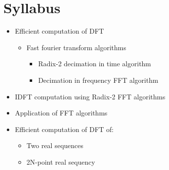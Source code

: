 \documentclass[../course]{subfiles}
\begin{document}
\section{Syllabus}

\begin{itemize}

    \item Efficient computation of DFT
        \begin{itemize}

            \item Fast fourier transform algorithms

                \begin{itemize}

                    \item Radix-2 decimation in time algorithm
                    \item Decimation in frequency FFT algorithm

                \end{itemize}

        \end{itemize}

    \item IDFT computation using Radix-2 FFT algorithms
    \item Application of FFT algorithms
    \item Efficient computation of DFT of:

        \begin{itemize}

            \item Two real sequences
            \item 2N-point real sequency

        \end{itemize}

\end{itemize}
\end{document}
